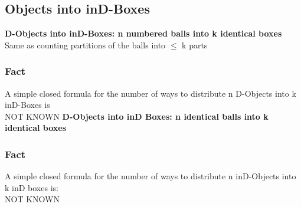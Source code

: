 \documentclass{article}[18pt]
\begin{document}
\subsection{Objects into inD-Boxes}
\textbf{D-Objects into inD-Boxes: n numbered balls into k identical boxes}\\
Same as counting partitions of the balls into $\leqslant$ k parts
\subsubsection{Fact}
A simple closed formula for the number of ways to distribute n D-Objects into k inD-Boxes is\\
NOT KNOWN
\textbf{D-Objects into inD Boxes: n identical balls into k identical boxes}
\subsubsection{Fact}
A simple closed formula for the number of ways to distribute n inD-Objects into k inD boxes is:\\
NOT KNOWN
\end{document}
